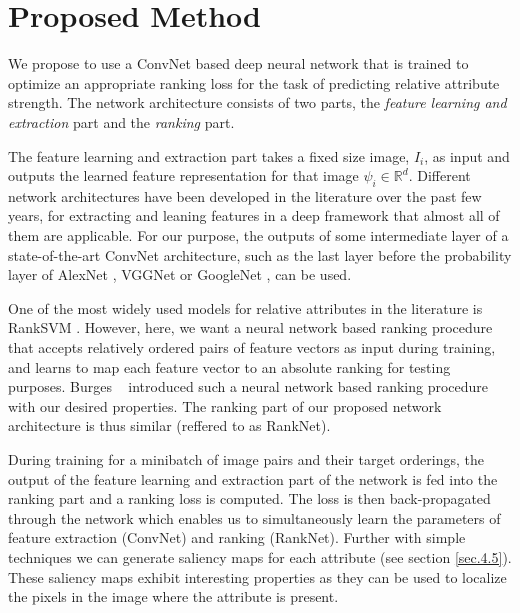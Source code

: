 

\section{Proposed Method}
\label{sec.3}

We propose to use a ConvNet based deep neural network that is trained to optimize an appropriate ranking loss for the task of predicting relative attribute strength. The network architecture consists of two parts, the \textit{feature learning and extraction} part and the \textit{ranking} part.

The feature learning and extraction part takes a fixed size image, $I_i$, as input and outputs the learned feature representation for that image $\psi_i \in \mathbb{R}^d$.
Different network architectures have been developed in the literature over the past few years, for extracting and leaning features in a deep framework that almost all of them are applicable. For our purpose, the outputs of some intermediate layer of a state-of-the-art ConvNet architecture, such as the last layer before the probability layer of AlexNet \cite{krizshevsky}, VGGNet \cite{verydeep} or GoogleNet \cite{googlenet},
can be used.

One of the most widely used models for relative attributes in the literature is RankSVM \cite{Joachims2002}. However, here, we want a neural network based ranking procedure that accepts relatively ordered pairs of feature vectors as input during training, and learns to map each feature vector to an absolute ranking for testing purposes. Burges \etal~\cite{Burges2005} introduced such a neural network based ranking procedure with our desired properties. The ranking part of our proposed network architecture is thus similar (reffered to as RankNet).

During training for a minibatch of image pairs and their target orderings, the output of the feature learning and extraction part of the network is fed into the ranking part and a ranking loss is computed. The loss is then back-propagated through the network which enables us to simultaneously learn the parameters of feature extraction (ConvNet) and ranking (RankNet). Further with simple techniques we can generate saliency maps for each attribute (see section \ref{sec.4.5}). These saliency maps exhibit interesting properties as they can be used to localize the pixels in the image where the attribute is present.

